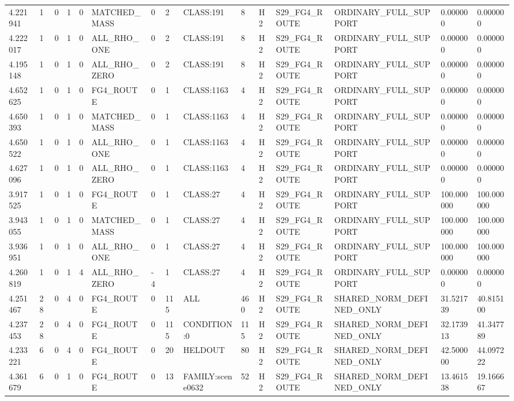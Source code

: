 \begin{tabular}{lllllllllllllll}
4.221941 & 1 & 0 & 1 & 0 & MATCHED\_MASS & 0 & 2 & CLASS:191 & 8 & H2 & S29\_FG4\_ROUTE & ORDINARY\_FULL\_SUPPORT & 0.000000 & 0.000000 \\
4.222017 & 1 & 0 & 1 & 0 & ALL\_RHO\_ONE & 0 & 2 & CLASS:191 & 8 & H2 & S29\_FG4\_ROUTE & ORDINARY\_FULL\_SUPPORT & 0.000000 & 0.000000 \\
4.195148 & 1 & 0 & 1 & 0 & ALL\_RHO\_ZERO & 0 & 2 & CLASS:191 & 8 & H2 & S29\_FG4\_ROUTE & ORDINARY\_FULL\_SUPPORT & 0.000000 & 0.000000 \\
4.652625 & 1 & 0 & 1 & 0 & FG4\_ROUTE & 0 & 1 & CLASS:1163 & 4 & H2 & S29\_FG4\_ROUTE & ORDINARY\_FULL\_SUPPORT & 0.000000 & 0.000000 \\
4.650393 & 1 & 0 & 1 & 0 & MATCHED\_MASS & 0 & 1 & CLASS:1163 & 4 & H2 & S29\_FG4\_ROUTE & ORDINARY\_FULL\_SUPPORT & 0.000000 & 0.000000 \\
4.650522 & 1 & 0 & 1 & 0 & ALL\_RHO\_ONE & 0 & 1 & CLASS:1163 & 4 & H2 & S29\_FG4\_ROUTE & ORDINARY\_FULL\_SUPPORT & 0.000000 & 0.000000 \\
4.627096 & 1 & 0 & 1 & 0 & ALL\_RHO\_ZERO & 0 & 1 & CLASS:1163 & 4 & H2 & S29\_FG4\_ROUTE & ORDINARY\_FULL\_SUPPORT & 0.000000 & 0.000000 \\
3.917525 & 1 & 0 & 1 & 0 & FG4\_ROUTE & 0 & 1 & CLASS:27 & 4 & H2 & S29\_FG4\_ROUTE & ORDINARY\_FULL\_SUPPORT & 100.000000 & 100.000000 \\
3.943055 & 1 & 0 & 1 & 0 & MATCHED\_MASS & 0 & 1 & CLASS:27 & 4 & H2 & S29\_FG4\_ROUTE & ORDINARY\_FULL\_SUPPORT & 100.000000 & 100.000000 \\
3.936951 & 1 & 0 & 1 & 0 & ALL\_RHO\_ONE & 0 & 1 & CLASS:27 & 4 & H2 & S29\_FG4\_ROUTE & ORDINARY\_FULL\_SUPPORT & 100.000000 & 100.000000 \\
4.260819 & 1 & 0 & 1 & 4 & ALL\_RHO\_ZERO & -4 & 1 & CLASS:27 & 4 & H2 & S29\_FG4\_ROUTE & ORDINARY\_FULL\_SUPPORT & 0.000000 & 0.000000 \\
4.251467 & 28 & 0 & 4 & 0 & FG4\_ROUTE & 0 & 115 & ALL & 460 & H2 & S29\_FG4\_ROUTE & SHARED\_NORM\_DEFINED\_ONLY & 31.521739 & 40.815100 \\
4.237453 & 28 & 0 & 4 & 0 & FG4\_ROUTE & 0 & 115 & CONDITION:0 & 115 & H2 & S29\_FG4\_ROUTE & SHARED\_NORM\_DEFINED\_ONLY & 32.173913 & 41.347789 \\
4.233221 & 6 & 0 & 4 & 0 & FG4\_ROUTE & 0 & 20 & HELDOUT & 80 & H2 & S29\_FG4\_ROUTE & SHARED\_NORM\_DEFINED\_ONLY & 42.500000 & 44.097222 \\
4.361679 & 6 & 0 & 1 & 0 & FG4\_ROUTE & 0 & 13 & FAMILY:scene0632 & 52 & H2 & S29\_FG4\_ROUTE & SHARED\_NORM\_DEFINED\_ONLY & 13.461538 & 19.166667 \\

\end{tabular}
